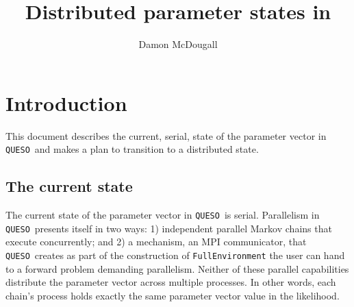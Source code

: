 \documentclass{article}
\title{Distributed parameter states in \Queso}
\author{Damon McDougall}
\newcommand{\Queso}{\texttt{QUESO}}
\begin{document}
\maketitle
\tableofcontents

\section{Introduction}

This document describes the current, serial, state of the parameter vector in
\Queso\ and makes a plan to transition to a distributed state.

\subsection{The current state}

The current state of the parameter vector in \Queso\ is serial.  Parallelism in
\Queso\ presents itself in two ways: 1) independent parallel Markov chains that
execute concurrently; and 2) a mechanism, an MPI communicator, that \Queso\
creates as part of the construction of \lstinline|FullEnvironment| the user can
hand to a forward problem demanding parallelism.  Neither of these parallel
capabilities distribute the parameter vector across multiple processes.  In
other words, each chain's process holds exactly the same parameter vector
value in the likelihood.
\end{document}
